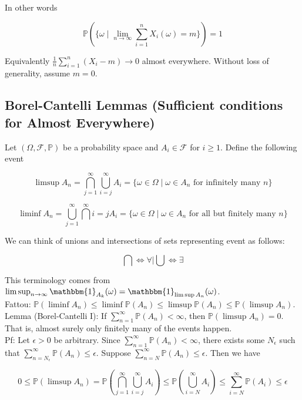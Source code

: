 \documentclass[english, 11pt]{article}
\begin{document}
In other words

\[\mathbb{P}(\{\omega \mid \lim_{n \to \infty} \sum_{i = 1}^n X_i(\omega) = m\}) = 1\]

Equivalently $\frac{1}{n} \sum_{i = 1}^n(X_i - m) \to 0$ almost everywhere. Without loss of generality, assume $m=0$.\\

\subsection{Borel-Cantelli Lemmas (Sufficient conditions for Almost Everywhere)}

Let $(\Omega, \mathcal{F}, \mathbb{P})$ be a probability space and $A_i \in \mathcal{F}$ for $i \geq 1$. Define the following event

\[\limsup A_n = \bigcap^\infty_{j = 1} \bigcup^\infty_{i=j} A_i = \{\omega \in \Omega \mid \omega \in A_n \text{ for infinitely many } n \}\]

\[\liminf A_n = \bigcup^\infty_{j = 1} \bigcap^\infty{i = j} A_i = \{\omega \in \Omega \mid \omega \in A_n \text{ for all but finitely many } n\}\]

We can think of unions and intersections of sets representing event as follows:

\[\bigcap \iff \forall \mid \bigcup \iff \exists\]

This terminology comes from $\limsup_{n \to \infty} \mathbbm{1}_{A_k}(\omega) = \mathbbm{1}_{\limsup A_n}(\omega)$.\\

Fattou: $\mathbb{P}(\liminf A_n) \leq \liminf \mathbb{P}(A_n) \leq \limsup \mathbb{P}(A_n) \leq \mathbb{P}(\limsup A_n)$.\\

Lemma (Borel-Cantelli I): If $\sum_{n = 1}^\infty \mathbb{P}(A_n) < \infty$, then $\mathbb{P}(\limsup A_n) = 0$. That is, almost surely only finitely many of the events happen.\\

Pf: Let $\epsilon > 0$ be arbitrary. Since $\sum_{n = 1}^\infty \mathbb{P}(A_n) < \infty$, there exists some $N_\epsilon$ such that $\sum_{n = N_\epsilon}^\infty \mathbb{P}(A_n) \leq \epsilon$. Suppose $\sum_{n = N}^\infty \mathbb{P}(A_n) \leq \epsilon$. Then we have

\[0 \leq \mathbb{P}(\limsup A_n) = \mathbb{P}(\bigcap_{j=1}^\infty \bigcup_{i = j}^\infty A_i) \leq \mathbb{P} (\bigcup_{i = N}^\infty A_i) \leq \sum_{i = N}^\infty \mathbb{P}(A_i) \leq \epsilon\]
\end{document}
